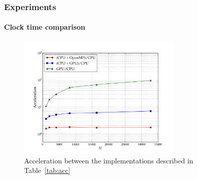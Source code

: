 \begin{frame}
    \frametitle{Experiments}
    \framesubtitle{Clock time comparison}

\begin{figure}[H]
    \centering
    \label{fig:acc}
    \includegraphics[width=0.7\textwidth]{img/test_gpu-acceleration.pdf}
    \caption{Acceleration between the implementations described in Table~\ref{tab:acc}}
\end{figure}

\end{frame}
